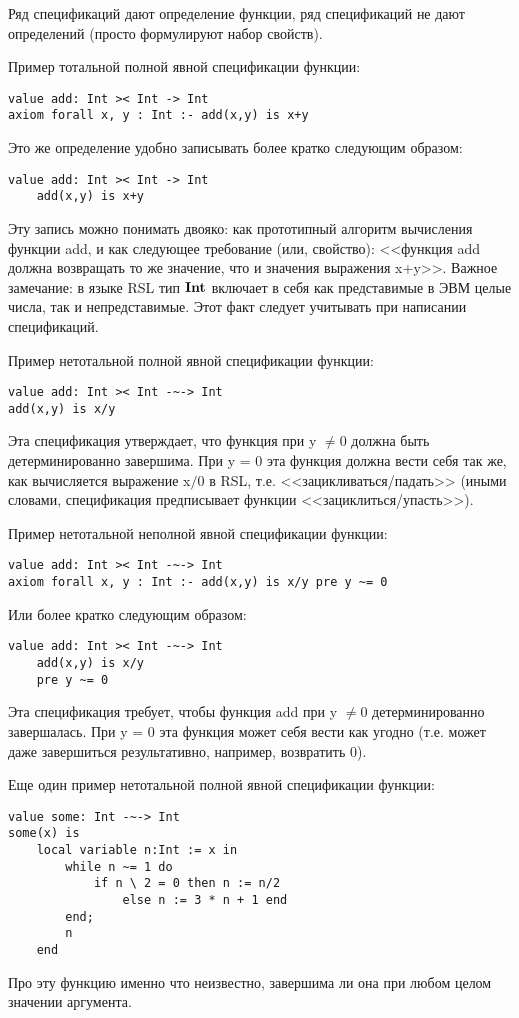 Ряд спецификаций дают определение функции, ряд спецификаций не дают определений (просто формулируют набор свойств).

Пример тотальной полной явной спецификации функции:
\begin{lstlisting}
value add: Int >< Int -> Int
axiom forall x, y : Int :- add(x,y) is x+y
\end{lstlisting}

Это же определение удобно записывать более кратко следующим образом:
\begin{lstlisting}
value add: Int >< Int -> Int
    add(x,y) is x+y
\end{lstlisting}
Эту запись можно понимать двояко: как прототипный алгоритм вычисления функции add, и как следующее требование (или, свойство): <<функция add должна возвращать то же значение, что и значения выражения x+y>>. Важное замечание: в языке RSL тип $\textbf{Int}$ включает в себя как представимые в ЭВМ целые числа, так и непредставимые. Этот факт следует учитывать при написании спецификаций.

Пример нетотальной полной явной спецификации функции:
\begin{lstlisting}
value add: Int >< Int -~-> Int
add(x,y) is x/y
\end{lstlisting}
Эта спецификация утверждает, что функция при y $\neq 0$ должна быть детерминированно завершима. При y = 0 эта функция должна вести себя так же, как вычисляется выражение x$/0$ в RSL, т.е. <<зацикливаться/падать>> (иными словами, спецификация предписывает функции <<зациклиться/упасть>>).

Пример нетотальной неполной явной спецификации функции:
\begin{lstlisting}
value add: Int >< Int -~-> Int
axiom forall x, y : Int :- add(x,y) is x/y pre y ~= 0
\end{lstlisting}
Или более кратко следующим образом:
\begin{lstlisting}
value add: Int >< Int -~-> Int
    add(x,y) is x/y
    pre y ~= 0
\end{lstlisting}

Эта спецификация требует, чтобы функция add при y $\neq 0$ детерминированно завершалась. При y = 0 эта функция может себя вести как угодно (т.е. может даже завершиться результативно, например, возвратить 0).

Еще один пример нетотальной полной явной спецификации функции:
\begin{lstlisting}
value some: Int -~-> Int
some(x) is
    local variable n:Int := x in
        while n ~= 1 do
            if n \ 2 = 0 then n := n/2
                else n := 3 * n + 1 end
        end;
        n
    end
\end{lstlisting}
Про эту функцию именно что неизвестно, завершима ли она при любом целом значении аргумента.

